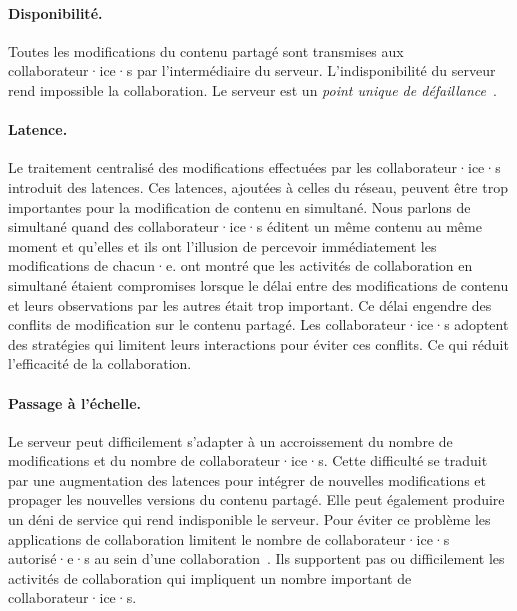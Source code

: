 \paragraph{Disponibilité.}
Toutes les modifications du contenu partagé sont transmises aux collaborateur·ice·s par l'intermédiaire du serveur.
L'indisponibilité du serveur rend impossible la collaboration.
Le serveur est un \emph{point unique de défaillance}~\autocite{dooley2001designing}.

\paragraph{Latence.}
Le traitement centralisé des modifications effectuées par les collaborateur·ice·s introduit des latences.
Ces latences, ajoutées à celles du réseau, peuvent être trop importantes pour la modification de contenu en simultané.
Nous parlons de simultané quand des collaborateur·ice·s éditent un même contenu au même moment et qu'elles et ils ont l'illusion de percevoir immédiatement les modifications de chacun·e.
\textcite{ignat_2015_user-and-delay} ont montré que les activités de collaboration en simultané étaient compromises lorsque le délai entre des modifications de contenu et leurs observations par les autres était trop important.
Ce délai engendre des conflits de modification sur le contenu partagé.
Les collaborateur·ice·s adoptent des stratégies qui limitent leurs interactions pour éviter ces conflits.
Ce qui réduit l'efficacité de la collaboration.

\paragraph{Passage à l'échelle.}
Le serveur peut difficilement s'adapter à un accroissement du nombre de modifications et du nombre de collaborateur·ice·s.
Cette difficulté se traduit par une augmentation des latences pour intégrer de nouvelles modifications et propager les nouvelles versions du contenu partagé.
Elle peut également produire un déni de service qui rend indisponible le serveur.
Pour éviter ce problème les applications de collaboration limitent le nombre de collaborateur·ice·s autorisé·e·s au sein d'une collaboration~\autocite{ignat_2015_user-and-delay,ignat2014_delayeffect}.
Ils supportent pas ou difficilement les activités de collaboration qui impliquent un nombre important de collaborateur·ice·s.

